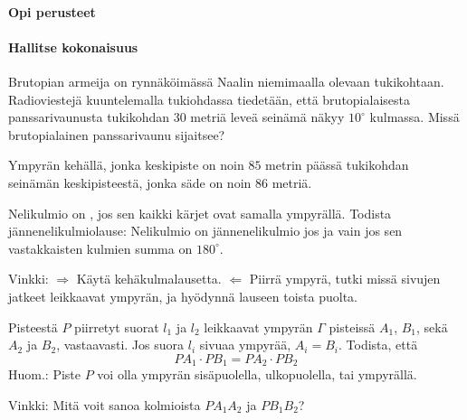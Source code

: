 \begin{tehtavasivu}

\paragraph*{Opi perusteet}

\paragraph*{Hallitse kokonaisuus}

\begin{tehtava}
Brutopian armeija on rynnäköimässä Naalin niemimaalla olevaan tukikohtaan. Radioviestejä kuuntelemalla tukiohdassa tiedetään, että brutopialaisesta panssarivaunusta tukikohdan $30$ metriä leveä seinämä näkyy $10^\circ$ kulmassa.
Missä brutopialainen panssarivaunu sijaitsee?
\begin{vastaus}
Ympyrän kehällä, jonka keskipiste on noin $85$ metrin päässä tukikohdan seinämän keskipisteestä, jonka säde on noin $86$ metriä.
\end{vastaus}
\end{tehtava}

\begin{tehtava}
Nelikulmio on , jos sen kaikki kärjet ovat samalla ympyrällä. Todista jännenelikulmiolause: Nelikulmio on jännenelikulmio jos ja vain jos sen vastakkaisten kulmien summa on $180^{\circ}$.
\begin{vastaus}
Vinkki: $\Rightarrow$ Käytä kehäkulmalausetta. $\Leftarrow$ Piirrä ympyrä, tutki missä sivujen jatkeet leikkaavat ympyrän, ja hyödynnä lauseen toista puolta.
\end{vastaus}
\end{tehtava}

\begin{tehtava}
Pisteestä $P$ piirretyt suorat $l_1$ ja $l_2$ leikkaavat ympyrän $\Gamma$ pisteissä $A_1$, $B_1$, sekä $A_2$ ja $B_2$, vastaavasti. Jos suora $l_{i}$ sivuaa ympyrää, $A_{i} = B_{i}$. Todista, että
\[
PA_{1}\cdot PB_{1} = PA_{2}\cdot PB_{2}
\]
Huom.: Piste $P$ voi olla ympyrän sisäpuolella, ulkopuolella, tai ympyrällä.
\begin{vastaus}
Vinkki: Mitä voit sanoa kolmioista $PA_1A_2$ ja $PB_1B_2$?
\end{vastaus}
\end{tehtava}

\end{tehtavasivu}
